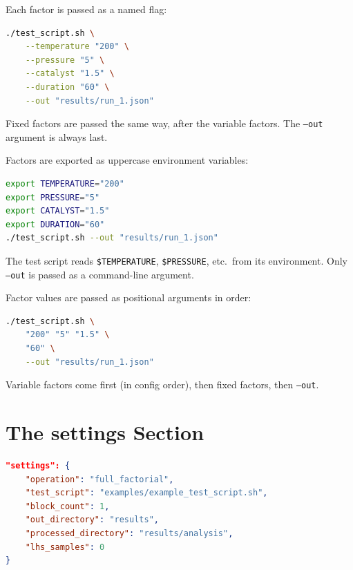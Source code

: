 \documentclass[11pt]{book}
\begin{document}
\begin{example}
Each factor is passed as a named flag:
\begin{lstlisting}[language=bash]
./test_script.sh \
    --temperature "200" \
    --pressure "5" \
    --catalyst "1.5" \
    --duration "60" \
    --out "results/run_1.json"
\end{lstlisting}
Fixed factors are passed the same way, after the variable factors. The \texttt{--out} argument is always last.
\end{example}

\begin{example}[env]
Factors are exported as uppercase environment variables:
\begin{lstlisting}[language=bash]
export TEMPERATURE="200"
export PRESSURE="5"
export CATALYST="1.5"
export DURATION="60"
./test_script.sh --out "results/run_1.json"
\end{lstlisting}
The test script reads \texttt{\$TEMPERATURE}, \texttt{\$PRESSURE}, etc.\ from its environment. Only \texttt{--out} is passed as a command-line argument.
\end{example}

\begin{example}[positional]
Factor values are passed as positional arguments in order:
\begin{lstlisting}[language=bash]
./test_script.sh \
    "200" "5" "1.5" \
    "60" \
    --out "results/run_1.json"
\end{lstlisting}
Variable factors come first (in config order), then fixed factors, then \texttt{--out}.
\end{example}

\section{The settings Section}

\begin{lstlisting}[language=json]
"settings": {
    "operation": "full_factorial",
    "test_script": "examples/example_test_script.sh",
    "block_count": 1,
    "out_directory": "results",
    "processed_directory": "results/analysis",
    "lhs_samples": 0
}
\end{lstlisting}
\end{document}

